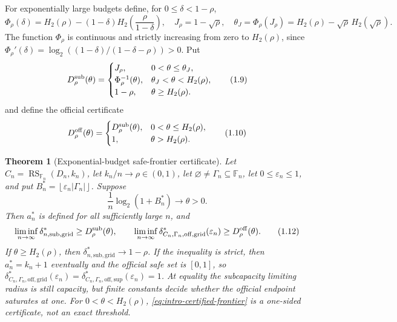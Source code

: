 \documentclass[11pt,a4paper]{amsart}
\numberwithin{equation}{section}
\newtheorem{theorem}{Theorem}[section]
\theoremstyle{remark}
\DeclareMathOperator{\RS}{RS}
\newcommand{\F}{\mathbb F}
\newcommand{\eps}{\varepsilon}
\newcommand{\abs}[1]{\lvert #1\rvert}
\newcommand{\floor}[1]{\left\lfloor #1\right\rfloor}
\begin{document}
For exponentially large budgets define, for \(0\le\delta<1-\rho\),
\[
 \Phi_\rho(\delta)=H_2(\rho)
 -(1-\delta)H_2\!\left(\frac{\rho}{1-\delta}\right),\quad
 J_\rho=1-\sqrt\rho,\quad
 \theta_J=\Phi_\rho(J_\rho)
 =H_2(\rho)-\sqrt\rho\,H_2(\sqrt\rho).             \tag{1.8}
 \label{eq:intro-Phi}
\]
The function \(\Phi_\rho\) is continuous and strictly increasing from
zero to \(H_2(\rho)\), since
\(\Phi_\rho'(\delta)=
\log_2((1-\delta)/(1-\delta-\rho))>0\).  Put
\[
 D_\rho^{\rm sub}(\theta)=
 \begin{cases}
 J_\rho,&0<\theta\le\theta_J,\\
 \Phi_\rho^{-1}(\theta),&\theta_J<\theta<H_2(\rho),\\
 1-\rho,&\theta\ge H_2(\rho).
 \end{cases}                                      \tag{1.9}
 \label{eq:intro-D}
\]
and define the official certificate
\[
 D_\rho^{\rm off}(\theta)=
 \begin{cases}
 D_\rho^{\rm sub}(\theta),&0<\theta\le H_2(\rho),\\
 1,&\theta>H_2(\rho).
 \end{cases}                                      \tag{1.10}
 \label{eq:intro-D-official}
\]

\begin{theorem}[Exponential-budget safe-frontier certificate]
\label{thm:intro-exponential-frontier}
Let \(C_n=\RS_{\F_n}(D_n,k_n)\), let \(k_n/n\to\rho\in(0,1)\),
let \(\varnothing\ne\Gamma_n\subseteq\F_n\), let \(0\le\eps_n\le1\), and put
\(B_n^*=\floor{\eps_n\abs{\Gamma_n}}\).  Suppose
\[
 \frac1n\log_2(1+B_n^*)\longrightarrow\theta>0.    \tag{1.11}
 \label{eq:intro-budget-exponent}
\]
Then \(a_n^*\) is defined for all sufficiently large \(n\), and
\[
 \liminf_{n\to\infty}\delta_{n,\mathrm{sub,grid}}^*
 \ge D_\rho^{\rm sub}(\theta),\qquad
 \liminf_{n\to\infty}\delta_{C_n,\Gamma_n,\mathrm{off,grid}}^*(\eps_n)
 \ge D_\rho^{\rm off}(\theta).                   \tag{1.12}
 \label{eq:intro-certified-frontier}
\]
If \(\theta\ge H_2(\rho)\), then
\(\delta_{n,\mathrm{sub,grid}}^*\to1-\rho\).  If the inequality is
strict, then \(a_n^*=k_n+1\) eventually and the official safe set is
\([0,1]\), so
\(\delta_{C_n,\Gamma_n,\mathrm{off,grid}}^*(\eps_n)
=\delta_{C_n,\Gamma_n,\mathrm{off,sup}}^*(\eps_n)=1\).
At equality the subcapacity limiting radius is still capacity, but finite
constants decide whether the official endpoint saturates at one.  For
\(0<\theta<H_2(\rho)\),
\eqref{eq:intro-certified-frontier} is a one-sided certificate, not an
exact threshold.
\end{theorem}
\end{document}
